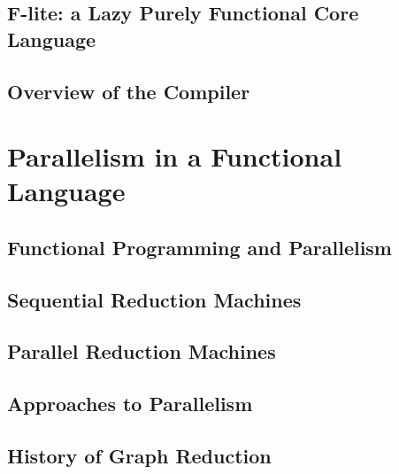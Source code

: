\documentclass[dottedtoc, headinclude, footinclude=true, a4paper, numbers=noenddot]{scrreprt}
\begin{document}
        \section{F-lite: a Lazy Purely Functional Core Language}
        \label{sec:Flite}
        
        
        \section{Overview of the Compiler}
        \label{sec:overview}
        

    \chapter{Parallelism in a Functional Language}
    \label{chap:background}
    
    
        \section{Functional Programming and Parallelism}
        \label{sec:FPandPar}
        
    
        \section{Sequential Reduction Machines}
        \label{sec:SequentialMachines}
        
    
        \section{Parallel Reduction Machines}
        \label{sec:ParallelMachines}
        
    
        \section{Approaches to Parallelism}
        \label{sec:Approaches}
        
        
        \section{History of Graph Reduction}
        
\end{document}
